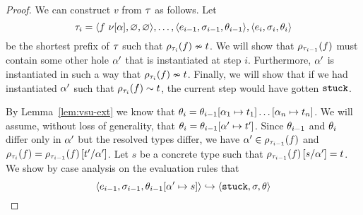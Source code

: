 \begin{proof}
  We can construct $v$ from $\trace$ as follows.
  Let
  $$
  \trace_i = \triple{\eapp{f}{\vhole{\thole}}}{\emptysu}{\emptysu},
             \ldots,
             \triple{e_{i-1}}{\vsu_{i-1}}{\tsu_{i-1}},
             \triple{e_{i}}{\vsu_{i}}{\tsu_{i}}
  $$
  be the shortest prefix of $\trace$ such that
  $\tincompat{\ptype{\trace_i}{f}}{t}$.
  We will show that $\ptype{\trace_{i-1}}{f}$ %
  must contain some other hole $\thole'$ that is
  instantiated at step $i$.
  Furthermore, $\thole'$ is instantiated in such a way that
  $\tincompat{\ptype{\trace_i}{f}}{t}$.
  Finally, we will show that if we had instantiated $\thole'$ such that
  $\tcompat{\ptype{\trace_i}{f}}{t}$,
  the current step would have gotten $\stuck$.


  By Lemma~\ref{lem:vsu-ext} we know that
  $\tsu_{i} = \tsu_{i-1}[\thole_1 \mapsto t_1] \ldots [\thole_n \mapsto t_n]$.
  We will assume, without loss of generality, that
  $\tsu_{i} = \tsu_{i-1}[\thole' \mapsto t']$.
  Since $\tsu_{i-1}$ and $\tsu_{i}$ differ only in $\thole'$ but the resolved
  types differ, we have
  $\thole' \in \ptype{\trace_{i-1}}{f}$
  and
  $\ptype{\trace_i}{f} = \ptype{\trace_{i-1}}{f}\sub{\thole'}{t'}$.
  Let $s$ be a
  concrete type such that $\ptype{\trace_{i-1}}{f}\sub{\thole'}{s} = t$.
  We show by case analysis on the evaluation rules that
  $$\step{e_{i-1}}{\vsu_{i-1}}{\tsu_{i-1}[\thole' \mapsto s]}{\stuck}{\vsu}{\tsu}$$


\end{proof}
